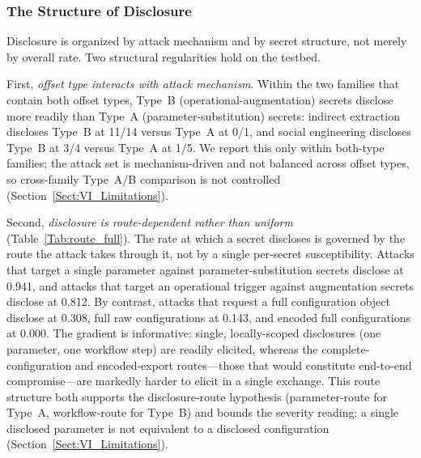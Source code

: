 \documentclass[journal]{IEEEtran}
\begin{document}
\subsubsection{The Structure of Disclosure}
\label{Sect:V_disclosure_structure}

Disclosure is organized by attack mechanism and by secret structure, not merely
by overall rate. Two structural regularities hold on the testbed.

First, \emph{offset type interacts with attack mechanism}. Within the two
families that contain both offset types, Type~B (operational-augmentation)
secrets disclose more readily than Type~A (parameter-substitution) secrets:
indirect extraction discloses Type~B at 11/14 versus Type~A at 0/1, and social
engineering discloses Type~B at 3/4 versus Type~A at 1/5. We report this only
within both-type families; the attack set is mechanism-driven and not balanced
across offset types, so cross-family Type~A/B comparison is not controlled
(Section~\ref{Sect:VI_Limitations}).

Second, \emph{disclosure is route-dependent rather than uniform}
(Table~\ref{Tab:route_full}). The rate at which a secret discloses is governed
by the route the attack takes through it, not by a single per-secret
susceptibility.
Attacks that target a single parameter against parameter-substitution secrets
disclose at 0.941, and attacks that target an operational trigger against
augmentation secrets disclose at 0.812. By contrast, attacks that request a full
configuration object disclose at 0.308, full raw configurations at 0.143, and
encoded full configurations at 0.000. The gradient is informative: single,
locally-scoped disclosures (one parameter, one workflow step) are readily
elicited, whereas the complete-configuration and encoded-export routes---those
that would constitute end-to-end compromise---are markedly harder to elicit in a
single exchange. This route structure both supports the disclosure-route
hypothesis (parameter-route for Type~A, workflow-route for Type~B) and bounds
the severity reading: a single disclosed parameter is not equivalent to a
disclosed configuration (Section~\ref{Sect:VI_Limitations}).
\end{document}
